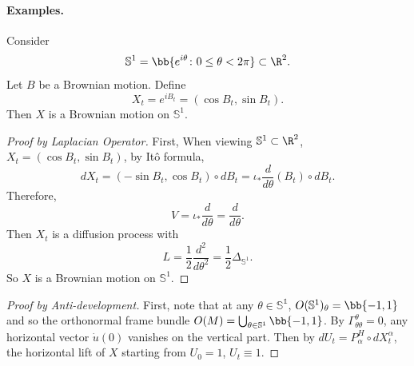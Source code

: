 \paragraph{Examples.}

\begin{exam}[Circle]
    Consider
    \begin{equation*}
        \mathbb{S}^1 = \bb{e^{i\theta} \colon 0 \leq \theta < 2\pi} \subset \R^2.
    \end{equation*}
    Let $B$ be a Brownian motion. Define
    \begin{equation*}
        X_t = e^{iB_t} = (\cos B_t, \sin B_t).
    \end{equation*}
    Then $X$ is a Brownian motion on $\mathbb{S}^1$.
    \begin{proof}[Proof by Laplacian Operator]
        First, When viewing $\mathbb{S}^1 \subset \R^2$, $X_t = (\cos B_t, \sin B_t)$, by It\^o formula,
        \begin{equation*}
            dX_t = (-\sin B_t,\cos B_t) \circ dB_t = \iota_*\frac{d}{d\theta}(B_t) \circ dB_t.
        \end{equation*}
        Therefore,
        \begin{equation*}
            V = \iota_*\frac{d}{d\theta} = \frac{d}{d \theta}.
        \end{equation*}
        Then $X_t$ is a diffusion process with
        \begin{equation*}
            L = \frac{1}{2}\frac{d^2}{d \theta^2} = \frac{1}{2}\Delta_{\mathbb{S}^1}.
        \end{equation*}
        So $X$ is a Brownian motion on $\mathbb{S}^1$. \qedhere
    \end{proof}
        
    \begin{proof}[Proof by Anti-development]
        First, note that at any $\theta \in \mathbb{S^1}$, $O(\mathbb{S}^1)_\theta = \bb{-1,1}$ and so the orthonormal frame bundle $O(M) = \bigcup_{\theta \in \mathbb{S}^1}\bb{-1,1}$. By $\Gamma^\theta_{\theta \theta} = 0$, any horizontal vector $\dot{u}(0)$ vanishes on the vertical part. Then by $dU_t = P^H_\alpha \circ dX_t^\alpha$, the horizontal lift of $X$ starting from $U_0 = 1$, $U_t \equiv  1$. 


\end{proof}
\end{exam}
